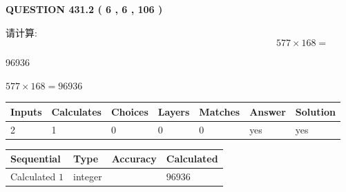 \documentclass{ctexart}
\begin{document}
   
  
\vspace{0.2in}
  
{\textbf{\Large{QUESTION
431.2 
 ( 6 , 6 , 106 )
}}}
  
  
 
请计算:
\begin{equation}
577  \times    %
168 = \nonumber
\end{equation}
 
 
 
\noindent{}
 
 

96936
 
 
\noindent{}
 
 

 
 
 
\noindent{}
 
 

$ %
577 \times  %
168=   %
96936$
 
 
\noindent{}
 
 

 
   
   
   
   
\noindent\begin{tabular}{|l|l|l|l|l|l|l|}
 \hline
Inputs & Calculates & Choices & Layers & Matches & Answer & Solution \\ \hline
 2  & 
 1  & 
 0
  & 
 0  & 
 0  & 
  yes & 
  yes 
  \\ \hline
 \end{tabular}
   
   
   
   
\noindent{}
   
   
  
  
\noindent\begin{tabular}{|l|l|l|l|}
\hline
 Sequential & Type & Accuracy & Calculated \\ 
\hline
 
 
  Calculated $  1 $ & integer &  & 
  $ 96936 $ 
 \\  \hline  
 \end{tabular}
   
\end{document}
